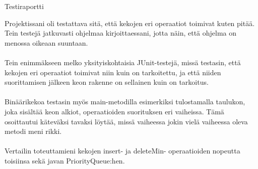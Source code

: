 \documentclass[12pt]{report}
\begin{document}
\begin{center}
  \begin{textbf}
    Testiraportti
  \end{textbf}
\end{center}
Projektissani oli testattava sitä, että kekojen eri operaatiot toimivat kuten pitää. Tein testejä jatkuvasti ohjelmaa kirjoittaessani, jotta näin, että ohjelma on menossa oikeaan suuntaan. \\
\ \\
Tein enimmäkseen melko yksityiskohtaisia JUnit-testejä, missä testasin, että kekojen eri operaatiot toimivat niin kuin on tarkoitettu, ja että niiden suorittamisen jälkeen keon rakenne on sellainen kuin on tarkoitus.\\
\ \\
Binäärikekoa testasin myös main-metodilla esimerkiksi tulostamalla taulukon, joka sisältää keon alkiot, operaatioiden suorituksen eri vaiheissa. Tämä osoittautui käteväksi tavaksi löytää, missä vaiheessa jokin vielä vaiheessa oleva metodi meni rikki. \\
\ \\
Vertailin toteuttamieni kekojen insert- ja deleteMin- operaatioiden nopeutta toisiinsa sekä javan PriorityQueue:hen. 
\end{document}
